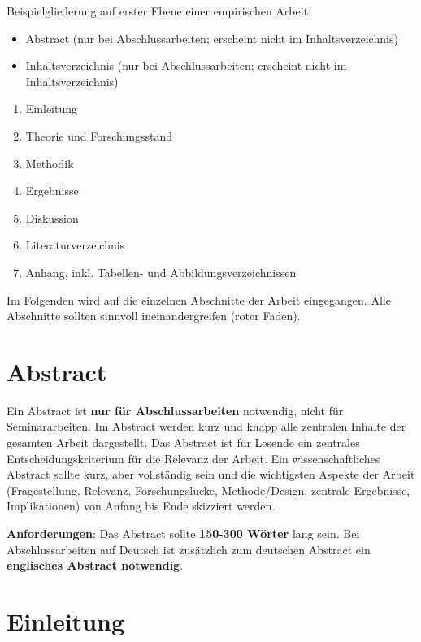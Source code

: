 \documentclass[
  letterpaper,
  DIV=11]{scrreprt}
\begin{document}
Beispielgliederung auf erster Ebene einer empirischen Arbeit:

\begin{itemize}
\item
  Abstract (nur bei Abschlussarbeiten; erscheint nicht im
  Inhaltsverzeichnis)
\item
  Inhaltsverzeichnis (nur bei Abschlussarbeiten; erscheint nicht im
  Inhaltsverzeichnis)
\end{itemize}

\begin{enumerate}
\def\labelenumi{\arabic{enumi}.}
\item
  Einleitung
\item
  Theorie und Forschungsstand
\item
  Methodik
\item
  Ergebnisse
\item
  Diskussion
\item
  Literaturverzeichnis
\item
  Anhang, inkl. Tabellen- und Abbildungsverzeichnissen
\end{enumerate}

Im Folgenden wird auf die einzelnen Abschnitte der Arbeit eingegangen.
Alle Abschnitte sollten sinnvoll ineinandergreifen (roter Faden).

\section{Abstract}\label{abstract}

Ein Abstract ist \textbf{nur für Abschlussarbeiten} notwendig, nicht für
Seminararbeiten. Im Abstract werden kurz und knapp alle zentralen
Inhalte der gesamten Arbeit dargestellt. Das Abstract ist für Lesende
ein zentrales Entscheidungskriterium für die Relevanz der Arbeit. Ein
wissenschaftliches Abstract sollte kurz, aber vollständig sein und die
wichtigsten Aspekte der Arbeit (Fragestellung, Relevanz,
Forschungslücke, Methode/Design, zentrale Ergebnisse, Implikationen) von
Anfang bis Ende skizziert werden.

\textbf{Anforderungen}: Das Abstract sollte \textbf{150-300 Wörter} lang
sein. Bei Abschlussarbeiten auf Deutsch ist zusätzlich zum deutschen
Abstract ein \textbf{englisches Abstract notwendig}.

\section{Einleitung}\label{einleitung}
\end{document}
